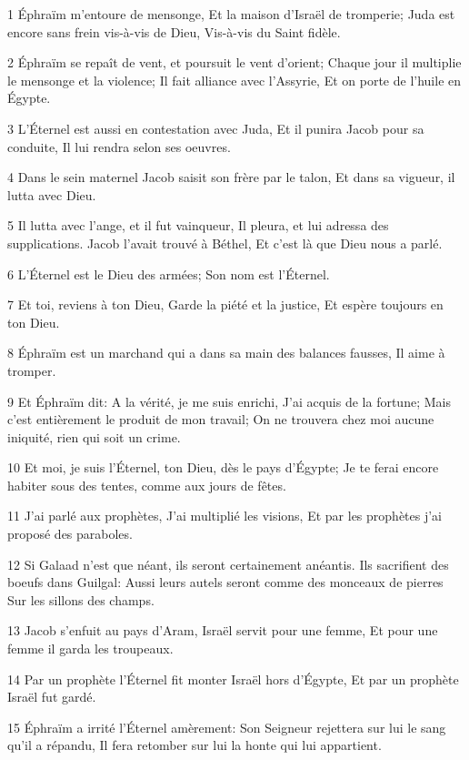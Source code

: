 \par 1 Éphraïm m'entoure de mensonge, Et la maison d'Israël de tromperie; Juda est encore sans frein vis-à-vis de Dieu, Vis-à-vis du Saint fidèle.
\par 2 Éphraïm se repaît de vent, et poursuit le vent d'orient; Chaque jour il multiplie le mensonge et la violence; Il fait alliance avec l'Assyrie, Et on porte de l'huile en Égypte.
\par 3 L'Éternel est aussi en contestation avec Juda, Et il punira Jacob pour sa conduite, Il lui rendra selon ses oeuvres.
\par 4 Dans le sein maternel Jacob saisit son frère par le talon, Et dans sa vigueur, il lutta avec Dieu.
\par 5 Il lutta avec l'ange, et il fut vainqueur, Il pleura, et lui adressa des supplications. Jacob l'avait trouvé à Béthel, Et c'est là que Dieu nous a parlé.
\par 6 L'Éternel est le Dieu des armées; Son nom est l'Éternel.
\par 7 Et toi, reviens à ton Dieu, Garde la piété et la justice, Et espère toujours en ton Dieu.
\par 8 Éphraïm est un marchand qui a dans sa main des balances fausses, Il aime à tromper.
\par 9 Et Éphraïm dit: A la vérité, je me suis enrichi, J'ai acquis de la fortune; Mais c'est entièrement le produit de mon travail; On ne trouvera chez moi aucune iniquité, rien qui soit un crime.
\par 10 Et moi, je suis l'Éternel, ton Dieu, dès le pays d'Égypte; Je te ferai encore habiter sous des tentes, comme aux jours de fêtes.
\par 11 J'ai parlé aux prophètes, J'ai multiplié les visions, Et par les prophètes j'ai proposé des paraboles.
\par 12 Si Galaad n'est que néant, ils seront certainement anéantis. Ils sacrifient des boeufs dans Guilgal: Aussi leurs autels seront comme des monceaux de pierres Sur les sillons des champs.
\par 13 Jacob s'enfuit au pays d'Aram, Israël servit pour une femme, Et pour une femme il garda les troupeaux.
\par 14 Par un prophète l'Éternel fit monter Israël hors d'Égypte, Et par un prophète Israël fut gardé.
\par 15 Éphraïm a irrité l'Éternel amèrement: Son Seigneur rejettera sur lui le sang qu'il a répandu, Il fera retomber sur lui la honte qui lui appartient.

